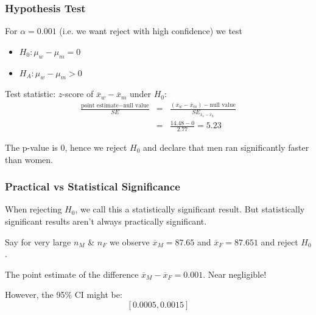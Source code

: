 \documentclass[handout]{beamer}
\newcommand{\blue}[1]{\textcolor{blue2}{#1}}
\newcommand{\xbar}{\overline{x}}
\begin{document}
\begin{frame}[fragile]
\frametitle{Hypothesis Test}
%
%
For $\alpha=0.001$ (i.e. we want reject with high confidence) we test
\begin{itemize}
\item $H_0: \mu_w - \mu_m = 0$
\item $H_A: \mu_w - \mu_m > 0$
\end{itemize}

\pause\vspace{0.25cm}

Test statistic:  $z$-score of $\xbar_w - \xbar_m$ under $H_0$:
\begin{eqnarray*}
\frac{\mbox{point estimate} - \mbox{null value}}{SE} &=& \frac{(\xbar_w - \xbar_m) - \mbox{null value}}{SE_{\xbar_1 - \xbar_2}}\\
&=& \frac{14.48 - 0}{2.77} = 5.23
\end{eqnarray*}

\pause\vspace{0.25cm}

The p-value is $0$, hence we reject $H_0$ and declare that men ran significantly faster than women.  
\end{frame}


\begin{frame}
\frametitle{Practical vs Statistical Significance}
When rejecting $H_0$, we call this a \blue{statistically significant} result.  But statistically significant results aren't always \blue{practically significant}.

\pause\vspace{0.5cm}

Say for \blue{very} large $n_M$ \& $n_F$ we observe $\xbar_M = 87.65$ and $\xbar_F = 87.651$ and reject $H_0$.  

\pause\vspace{0.5cm}

The point estimate of the difference $\xbar_M - \xbar_F = 0.001$.  Near negligible!  

\pause\vspace{0.5cm}

However, the 95\% CI might be:
\[
[0.0005, 0.0015]
\]

\end{frame}
\end{document}
